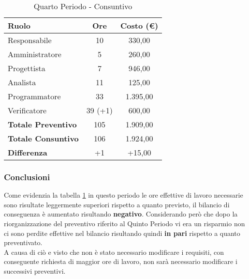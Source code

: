 \documentclass[../PianoDiProgetto_v3.0.0.tex]{subfiles}
\begin{document}
		\begin{table}[h]
				\centering
				\begin{tabular}{l * {2}{c}}
					\toprule
					\textbf{Ruolo} & \textbf{Ore} & \textbf{Costo (\euro{})} \\
					\midrule
					Responsabile & 10 & 330,00 \\

					Amministratore & 5 & 260,00 \\

					Progettista & 7 & 946,00 \\

					Analista & 11 & 125,00 \\		

					Programmatore & 33 & 1.395,00 \\		

					Verificatore & 39 (+1) & 600,00 \\				
					\midrule		
					\textbf{Totale Preventivo} & 105 & 1.909,00 \\
					\textbf{Totale Consuntivo} & 106  & 1.924,00 \\
					\midrule
					\textbf{Differenza} & +1  & +15,00 \\
					\bottomrule
				\end{tabular}
				\caption{Quarto Periodo - Consuntivo}
				\label{tab:consuntivo5}	
			\end{table}
		
		\subsubsection{Conclusioni}
		Come evidenzia la tabella \ref{tab:consuntivo5} in questo periodo le ore effettive di lavoro necessarie sono risultate leggermente superiori rispetto a quanto previsto, il  bilancio di conseguenza è aumentato risultando \textbf{negativo}. Considerando però che dopo la riorganizzazione del preventivo riferito al Quinto Periodo vi era un risparmio non ci sono perdite effettive nel bilancio risultando quindi \textbf{in pari} rispetto a quanto preventivato.\\
		A causa di ciò e visto che non è stato necessario modificare i requisiti, con conseguente richiesta di maggior ore di lavoro, non sarà necessario modificare i successivi preventivi.
		
\end{document}
